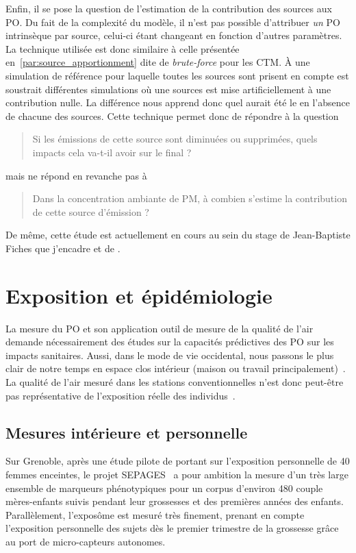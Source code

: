 Enfin, il se pose la question de l'estimation de la contribution des sources aux PO. Du
fait de la complexité du modèle, il n'est pas possible d'attribuer \emph{un} PO
intrinsèque par source, celui-ci étant changeant en fonction d'autres paramètres.
La technique utilisée est donc similaire à celle présentée
en~\ref{par:source_apportionment} dite de \textit{brute-force} pour les CTM. À une
simulation de référence pour laquelle toutes les sources sont prisent en compte est
soustrait différentes simulations où une sources est mise artificiellement à une
contribution nulle.  La différence nous apprend donc quel aurait été le \POv{} en
l'absence de chacune des sources.
Cette technique permet donc de répondre à la question
\begin{quote}
   Si les émissions de cette source sont diminuées ou supprimées, quels impacts cela va-t-il
   avoir sur le \POv{} final ?
\end{quote}
mais ne répond en revanche pas à
\begin{quote}
   Dans la concentration ambiante de PM, à combien s'estime la contribution de cette source
   d'émission ?
\end{quote}

De même, cette étude est actuellement en cours au sein du stage de Jean-Baptiste Fiches
que j'encadre et de \cite{borlazaUrbaninprep.}.

\section{Exposition et épidémiologie}

La mesure du PO et son application outil de mesure de la qualité de l'air demande
nécessairement des études sur la capacités prédictives des PO sur les impacts sanitaires.
Aussi, dans le mode de vie occidental, nous passons le plus clair de notre temps en espace
clos intérieur (maison ou travail
principalement)~\autocite{netheryTime2009,ouidirEstimation2015}. La qualité de l'air
mesuré dans les stations conventionnelles n'est donc peut-être pas représentative de
l'exposition réelle des individus~\autocite{sauvainOxidative2015}.

\subsection{Mesures intérieure et personnelle}

Sur Grenoble, après une étude pilote de \cite{ouidirEstimation2015} portant sur
l'exposition personnelle de 40 femmes enceintes, le projet
SEPAGES~\autocite{lyon-caenDeciphering2019} a pour ambition la mesure d'un très large
ensemble de marqueurs phénotypiques pour un corpus d'environ 480 couple mères-enfants
suivis pendant leur grossesses et des premières années des enfants. Parallèlement,
l'exposôme est mesuré très finement, prenant en compte l'exposition personnelle des
sujets dès le premier trimestre de la grossesse grâce au port de micro-capteurs autonomes.

